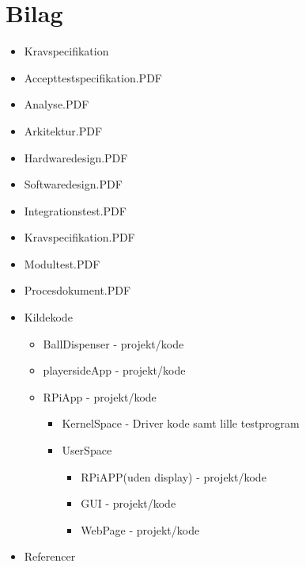 \documentclass[Rapport/Rapport_main.tex]{subfiles}
\begin{document}
\section{Bilag}
\begin{itemize}
    \item Kravspecifikation
    \item Accepttestspecifikation.PDF
    \item Analyse.PDF
    \item Arkitektur.PDF
    \item Hardwaredesign.PDF
    \item Softwaredesign.PDF
    \item Integrationstest.PDF
    \item Kravspecifikation.PDF
    \item Modultest.PDF
    \item Procesdokument.PDF
    \item Kildekode
    \begin{itemize}
        \item BallDispenser - projekt/kode
        \item playersideApp - projekt/kode
        \item RPiApp - projekt/kode
        \begin{itemize}
            \item KernelSpace - Driver kode samt lille testprogram
            \item UserSpace 
            \begin{itemize}
                \item RPiAPP(uden display) - projekt/kode
                \item GUI - projekt/kode
                \item WebPage - projekt/kode
            \end{itemize}
        \end{itemize}
    \end{itemize}
    \item Referencer
\end{itemize}
\end{document}
